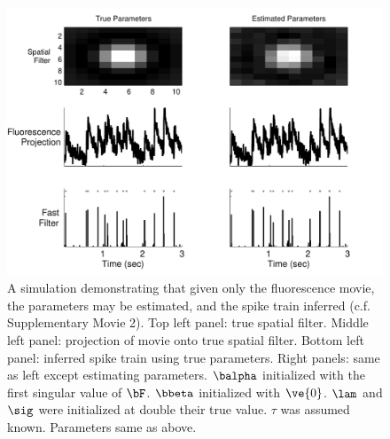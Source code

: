 \begin{figure}[H]
\centering \includegraphics[width=.9\linewidth]{../figs/spatial_EM}
\caption{A simulation demonstrating that given only the fluorescence movie, the parameters may be estimated, and the spike train inferred (c.f. Supplementary Movie 2). Top left panel: true spatial filter.  Middle left panel: projection of movie onto true spatial filter. Bottom left panel: inferred spike train using true parameters. Right panels: same as left except estimating parameters.  $\balpha$ initialized with the first singular value of $\bF$.  $\bbeta$ initialized with $\ve{0}$.  $\lam$ and $\sig$ were initialized at double their true value.  $\tau$ was assumed known. Parameters same as above.} \label{fig:spatial_EM}
\end{figure}
